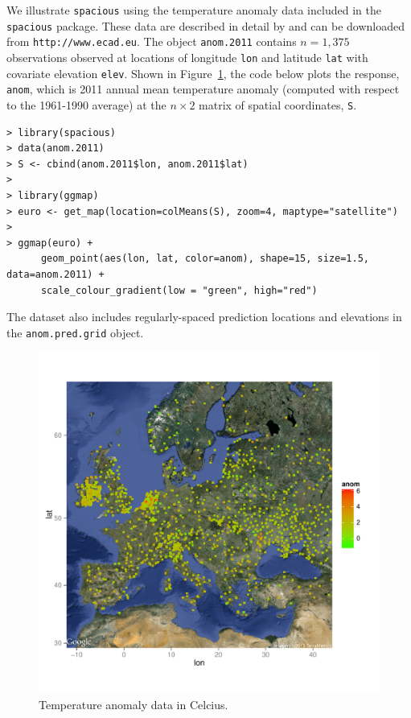 \documentclass[11pt]{article}
\begin{document}
We illustrate {\tt spacious} using the temperature anomaly data included in the {\tt spacious} package.
These data are described in detail by \cite{klein-2002a} and can be downloaded from {\tt http://www.ecad.eu}.
The object {\tt anom.2011} contains $n=1,375$ observations observed at locations of longitude {\tt lon} and latitude {\tt lat} with covariate elevation {\tt elev}.
Shown in Figure~\ref{f:data}, the code below plots the response, {\tt anom}, which is 2011 annual mean temperature anomaly (computed with respect to the 1961-1990 average) at the $n\times 2$ matrix of spatial coordinates, {\tt S}.

\begin{verbatim}
> library(spacious)
> data(anom.2011)
> S <- cbind(anom.2011$lon, anom.2011$lat)
>
> library(ggmap)
> euro <- get_map(location=colMeans(S), zoom=4, maptype="satellite")
> 
> ggmap(euro) +
      geom_point(aes(lon, lat, color=anom), shape=15, size=1.5, data=anom.2011) +
      scale_colour_gradient(low = "green", high="red")
\end{verbatim}
The dataset also includes regularly-spaced prediction locations and elevations in the {\tt anom.pred.grid} object.

\begin{figure}
	\caption{Temperature anomaly data in Celcius.}\label{f:data}
	\centering
	\includegraphics[width=5.5in]{figures/data.pdf}
\end{figure}
\end{document}
